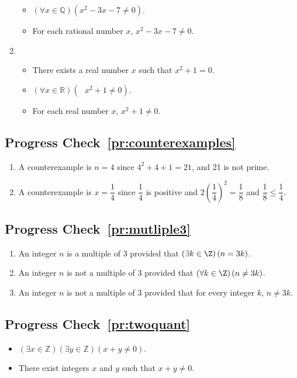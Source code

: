 \begin{enumerate}
\begin{itemize}
\item $(\forall x \in \mathbb{Q}) \left( x^2  - 3x - 7 \ne 0 \right)$.

\item For each rational number  $x$, $x^2  - 3x - 7 \ne 0$.
\end{itemize}

\item \begin{itemize}
\item There exists a real number  $x$  such that  $x^2  + 1 = 0$.

\item $(\forall x \in \mathbb{R}) \left( \text{ }x^2  + 1 \ne 0 \right)$.

\item For each real number  $x$, $x^2  + 1 \ne 0$.
\end{itemize}
\end{enumerate}

\subsection*{Progress Check~\ref{pr:counterexamples}}
\begin{enumerate}
\item A counterexample is $n = 4$ since $4^2 + 4 + 1 = 21$, and 21 is not prime.

\item A counterexample is $x = \dfrac{1}{4}$ since $\dfrac{1}{4}$ is positive and 
$2 \left( \dfrac{1}{4} \right)^2 = \dfrac{1}{8}$ and $\dfrac{1}{8} \leq \dfrac{1}{4}$.
\end{enumerate}



\subsection*{Progress Check~\ref{pr:mutliple3}}
\begin{enumerate}
\item An integer $n$ is a multiple of 3 provided that 
$\left( \exists k \in \Z \right) \left( n = 3k \right)$.

\setcounter{enumi}{3}
\item An integer $n$ is not a multiple of 3 provided that 
$\left( \forall k \in \Z \right) \left( n \ne 3k \right)$.

\item An integer $n$ is not a multiple of 3 provided that for every integer $k$, $n \ne 3k$.
\end{enumerate}

\subsection*{Progress Check~\ref{pr:twoquant}}
\begin{itemize}
\item $\left( {\exists x \in \mathbb{Z}} \right)\left( {\exists y \in \mathbb{Z}} \right)\left( {x + y \ne 0} \right)$.

\item There exist integers $x$ and $y$ such that $x + y \ne 0$.
\end{itemize}
\hbreak

\endinput
